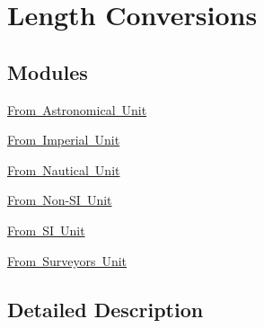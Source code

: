\hypertarget{group___e_g_x_math-_conversions-_length_conversions}{}\section{Length Conversions}
\label{group___e_g_x_math-_conversions-_length_conversions}
\subsection*{Modules}
\begin{DoxyCompactItemize}
\item 
\mbox{\hyperlink{group___e_g_x_math-_conversions-_length_conversions-_astronomical}{From Astronomical Unit}}
\item 
\mbox{\hyperlink{group___e_g_x_math-_conversions-_length_conversions-_imperial}{From Imperial Unit}}
\item 
\mbox{\hyperlink{group___e_g_x_math-_conversions-_length_conversions-_nautical}{From Nautical Unit}}
\item 
\mbox{\hyperlink{group___e_g_x_math-_conversions-_length_conversions-_non-_s_i}{From Non-\/\+S\+I Unit}}
\item 
\mbox{\hyperlink{group___e_g_x_math-_conversions-_length_conversions-_s_i}{From S\+I Unit}}
\item 
\mbox{\hyperlink{group___e_g_x_math-_conversions-_length_conversions-_surveyors}{From Surveyors Unit}}
\end{DoxyCompactItemize}


\subsection{Detailed Description}

